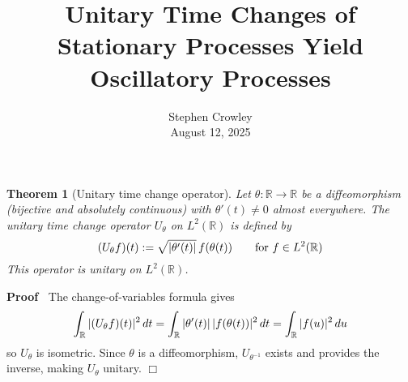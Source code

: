\documentclass{article}
\newcommand{\assign}{:=}
\newcommand{\tmaffiliation}[1]{\\ #1}
\newenvironment{proof}{\noindent\textbf{Proof\ }}{\hspace*{\fill}$\Box$\medskip}
\newtheorem{theorem}{Theorem}
\begin{document}
\title{Unitary Time Changes of Stationary Processes Yield Oscillatory Processes}

\author{
  Stephen Crowley
  \tmaffiliation{August 12, 2025}
}

\date{}

\maketitle

\begin{theorem}
  [Unitary time change operator] Let $\theta : \mathbb{R} \to \mathbb{R}$ be a diffeomorphism (bijective and absolutely continuous) with $\theta'(t) \neq 0$ almost everywhere. The unitary time change operator $U_{\theta}$ on $L^2(\mathbb{R})$ is defined by
  \begin{equation}
    (U_{\theta} f)(t) \assign \sqrt{|\theta'(t)|} \hspace{0.17em} f(\theta(t)) \qquad \text{for } f \in L^2(\mathbb{R})
  \end{equation}
  This operator is unitary on $L^2(\mathbb{R})$.
\end{theorem}

\begin{proof}
  The change-of-variables formula gives
  \begin{equation}
    \int_{\mathbb{R}} |(U_{\theta} f)(t)|^2 \hspace{0.17em} dt = \int_{\mathbb{R}} |\theta'(t)| \hspace{0.17em} |f(\theta(t))|^2 \hspace{0.17em} dt = \int_{\mathbb{R}} |f(u)|^2 \hspace{0.17em} du
  \end{equation}
  so $U_{\theta}$ is isometric. Since $\theta$ is a diffeomorphism, $U_{\theta^{-1}}$ exists and provides the inverse, making $U_{\theta}$ unitary.
\end{proof}
\end{document}

